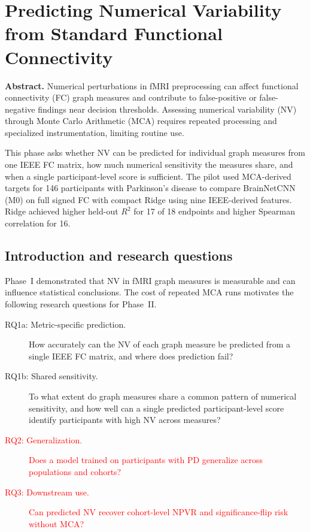 \chapter{Predicting Numerical Variability from Standard Functional Connectivity}
\label{chap:future-work}
\noindent\textbf{Abstract.}\enspace
Numerical perturbations in fMRI preprocessing can affect functional connectivity (FC) graph measures and contribute to false-positive or false-negative findings near decision thresholds. Assessing numerical variability (NV) through Monte Carlo Arithmetic (MCA) requires repeated processing and specialized instrumentation, limiting routine use.

This phase asks whether NV can be predicted for individual graph measures from one IEEE FC matrix, how much numerical sensitivity the measures share, and when a single participant-level score is sufficient. The pilot used MCA-derived targets for 146 participants with Parkinson's disease to compare BrainNetCNN (M0) on full signed FC with compact Ridge using nine IEEE-derived features. Ridge achieved higher held-out $R^2$ for 17 of 18 endpoints and higher Spearman correlation for 16.

\section{Introduction and research questions}

Phase~I demonstrated that NV in fMRI graph measures is measurable and can influence statistical conclusions. The cost of repeated MCA runs motivates the following research questions for Phase~II.

\begin{description}
  \item[RQ1a: Metric-specific prediction.] How accurately can the NV of each graph measure be predicted from a single IEEE FC matrix, and where does prediction fail?
  \item[RQ1b: Shared sensitivity.] To what extent do graph measures share a common pattern of numerical sensitivity, and how well can a single predicted participant-level score identify participants with high NV across measures?
  \item[\textcolor{red}{RQ2: Generalization.}] \textcolor{red}{Does a model trained on participants with PD generalize across populations and cohorts?}
  \item[\textcolor{red}{RQ3: Downstream use.}] \textcolor{red}{Can predicted NV recover cohort-level NPVR and significance-flip risk without MCA?}
\end{description}


